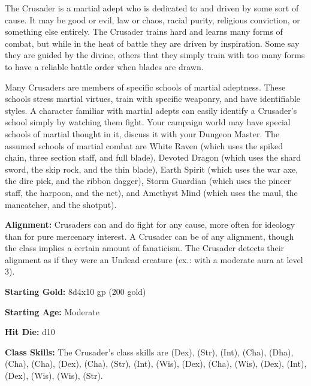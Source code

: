 
The Crusader is a martial adept who is dedicated to and driven by some sort of cause. It may be good or evil, law or chaos, racial purity, religious conviction, or something else entirely. The Crusader trains hard and learns many forms of combat, but while in the heat of battle they are driven by inspiration. Some say they are guided by the divine, others that they simply train with too many forms to have a reliable battle order when blades are drawn.

Many Crusaders are members of specific schools of martial adeptness. These schools stress martial virtues, train with specific weaponry, and have identifiable styles. A character familiar with martial adepts can easily identify a Crusader's school simply by watching them fight. Your campaign world may have special schools of martial thought in it, discuss it with your Dungeon Master. The assumed schools of martial combat are White Raven (which uses the spiked chain, three section staff, and full blade), Devoted Dragon (which uses the shard sword, the skip rock, and the thin blade), Earth Spirit (which uses the war axe, the dire pick, and the ribbon dagger), Storm Guardian (which uses the pincer staff, the harpoon, and the net), and Amethyst Mind (which uses the maul, the mancatcher, and the shotput).

\textbf{Alignment:} Crusaders can and do fight for any cause, more often for ideology than for pure mercenary interest. A Crusader can be of any alignment, though the class implies a certain amount of fanaticism. The Crusader detects their alignment as if they were an Undead creature (ex.: with a moderate aura at level 3).

\textbf{Starting Gold:} 8d4x10 gp (200 gold)

\textbf{Starting Age:} Moderate

\textbf{Hit Die:} d10

\textbf{Class Skills:} The Crusader's class skills are  (Dex),  (Str),  (Int),  (Cha),  (Dha),  (Cha),  (Cha),  (Dex),  (Cha),  (Str),  (Int),  (Wis),  (Dex),  (Cha),  (Wis),  (Dex),  (Int),  (Dex),  (Wis),  (Wis),  (Str).

